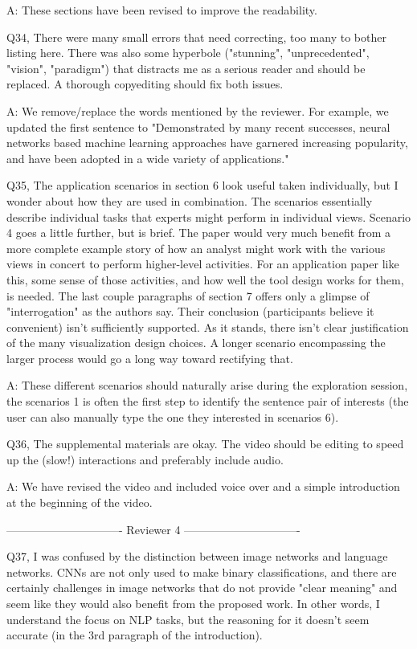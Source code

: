 A: These sections have been revised to improve the readability.

Q34, There were many small errors that need correcting, too many to bother listing here. There was also some hyperbole ("stunning", "unprecedented", "vision", "paradigm") that distracts me as a serious reader and should be replaced. A thorough copyediting should fix both issues.

A: We remove/replace the words mentioned by the reviewer. For example, we updated the first sentence to "Demonstrated by many recent successes, neural networks based machine learning approaches have garnered increasing popularity, and have been adopted in a wide variety of applications."


Q35, The application scenarios in section 6 look useful taken individually, but I wonder about how they are used in combination. The scenarios essentially describe individual tasks that experts might perform in individual views. Scenario 4 goes a little further, but is brief. The paper would very much benefit from a more complete example story of how an analyst might work with the various views in concert to perform higher-level activities. For an application paper like this, some sense of those activities, and how well the tool design works for them, is needed. The last couple paragraphs of section 7 offers only a glimpse of "interrogation" as the authors say.
Their conclusion (participants believe it convenient) isn't sufficiently supported. As it stands, there isn't clear justification of the many visualization design choices. A longer scenario encompassing the larger process would go a long way toward rectifying that.

A: These different scenarios should naturally arise during the exploration session, the scenarios 1 is often the first step to identify the sentence pair of interests (the user can also manually type the one they interested in scenarios 6).

Q36, The supplemental materials are okay. The video should be editing to speed up the (slow!) interactions and preferably include audio.

A: We have revised the video and included voice over and a simple introduction at the beginning of the video.


------------------------------- Reviewer 4 -------------------------------

Q37, I was confused by the distinction between image networks and language networks. CNNs are not only used to make binary classifications, and there are certainly challenges in image networks that do not provide "clear meaning" and seem like they would also benefit from the proposed work. In other words, I understand the focus on NLP tasks, but the reasoning for it doesn't seem accurate (in the 3rd paragraph of the introduction).


